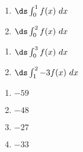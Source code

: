 {\noindent
\begin{minipage}{\linewidth}
\end{minipage}
\noindent\begin{minipage}[t]{.5\linewidth}
\begin{enumerate}
\item		$\ds \int_0^1 f(x)\ dx$
\item		$\ds \int_0^2 f(x)\ dx$
\end{enumerate}
\end{minipage}
\begin{minipage}[t]{.5\linewidth}
\begin{enumerate}\addtocounter{enumii}{2}
\item		$\ds \int_0^3 f(x)\ dx$
\item		$\ds \int_1^2 -3f(x)\ dx$
\end{enumerate}
\end{minipage}
}
{\begin{enumerate}
\item		$-59$
\item		$-48$
\item		$-27$
\item		$-33$
\end{enumerate}
}

